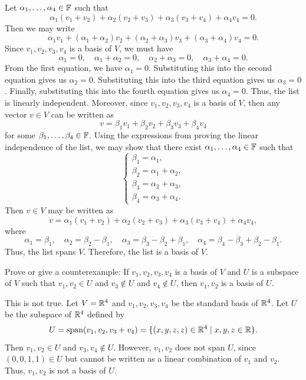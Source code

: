 \begin{exc}
\begin{solution}
Let $\alpha_1,\dots,\alpha_4\in\mathbb{F}$ such that
\[ \alpha_1(v_1+v_2)+\alpha_2(v_2+v_3)+\alpha_3(v_3+v_4)+\alpha_4v_4 = 0. \]
Then we may write
\[ \alpha_1v_1+(\alpha_1+\alpha_2)v_2+(\alpha_2+\alpha_3)v_3
   +(\alpha_3+\alpha_4)v_4 = 0. \]
Since $v_1,v_2,v_3,v_4$ is a basis of $V$, we must have
\[ \alpha_1=0, \quad \alpha_1+\alpha_2=0, \quad \alpha_2+\alpha_3=0, \quad
   \alpha_3+\alpha_4=0. \]
From the first equation, we have $\alpha_1=0$. Substituting this into the second
equation gives us $\alpha_2=0$. Substituting this into the third equation gives
us $\alpha_3=0$. Finally, substituting this into the fourth equation gives us
$\alpha_4=0$. Thus, the list is linearly independent. Moreover, since
$v_1,v_2,v_3,v_4$ is a basis of $V$, then any vector $v\in V$ can be written as
\[ v = \beta_1v_1+\beta_2v_2+\beta_3v_3+\beta_4v_4 \]
for some $\beta_1,\dots,\beta_4\in\mathbb{F}$. Using the expressions from proving the
linear independence of the list, we may show that there exist
$\alpha_1,\dots,\alpha_4\in\mathbb{F}$ such that
\[ \begin{cases}
   \beta_1=\alpha_1,\\
   \beta_2=\alpha_1+\alpha_2,\\
   \beta_3=\alpha_2+\alpha_3,\\
   \beta_4=\alpha_3+\alpha_4.
   \end{cases} \]
Then $v\in V$ may be written as
\[ v = \alpha_1(v_1+v_2)+\alpha_2(v_2+v_3)+\alpha_3(v_3+v_4)+\alpha_4v_4, \]
where
\[ \alpha_1=\beta_1, \quad \alpha_2=\beta_2-\beta_1, \quad
   \alpha_3=\beta_3-\beta_2+\beta_1, \quad
   \alpha_4=\beta_4-\beta_3+\beta_2-\beta_1. \]
Thus, the list spans $V$. Therefore, the list is a basis of $V$.
\end{solution}

\begin{exercise}
Prove or give a counterexample: If $v_1,v_2,v_3,v_4$ is a basis of $V$ and $U$ is
a subspace of $V$ such that $v_1,v_2\in U$ and $v_3\notin U$ and $v_4\notin U$,
then $v_1,v_2$ is a basis of $U$.
\end{exercise}
\begin{solution}
This is not true. Let $V=\mathbb{R}^4$ and $v_1,v_2,v_3,v_4$ be the standard basis of
$\mathbb{R}^4$. Let $U$ be the subspace of $\mathbb{R}^4$ defined by
\[ U = \operatorname{span}(v_1,v_2,v_3+v_4) = \{(x,y,z,z)\in\mathbb{R}^4 \mid x,y,z\in\mathbb{R}\}. \]
Then $v_1,v_2\in U$ and $v_3,v_4\notin U$. However, $v_1,v_2$ does not span
$U$, since $(0,0,1,1)\in U$ but cannot be written as a linear combination of
$v_1$ and $v_2$. Thus, $v_1,v_2$ is not a basis of $U$.
\end{solution}


\end{exc}

